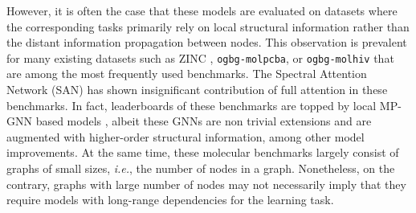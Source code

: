 \documentclass{article}
\begin{document}
However, it is often the case that these models are evaluated on datasets where the corresponding tasks primarily rely on local structural information rather than the distant information propagation between nodes. This observation is prevalent for many existing datasets such as ZINC \cite{dwivedi2020benchmarking}, \texttt{ogbg-molpcba}, or \texttt{ogbg-molhiv} \cite{hu2020open} that are among the most frequently used benchmarks. The Spectral Attention Network (SAN) \cite{kreuzer2021rethinking} has shown insignificant contribution of full attention in these benchmarks. In fact, leaderboards of these benchmarks are topped by local MP-GNN based models \cite{bodnar2021weisfeiler, zhang2021nested, lim2022sign}, albeit these GNNs are non trivial extensions and are augmented with higher-order structural information, among other model improvements. At the same time, these molecular benchmarks  largely consist of graphs of small sizes, \textit{i.e.}, the number of nodes in a graph. Nonetheless, on the contrary, graphs with large number of nodes may not necessarily imply that they require models with long-range dependencies for the learning task. 
\end{document}

